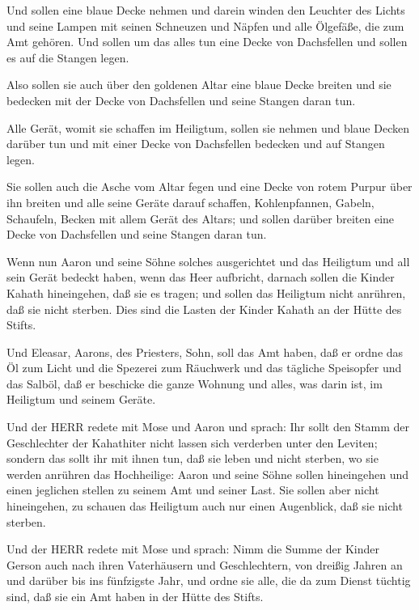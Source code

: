  Und sollen eine blaue Decke nehmen und darein winden den
Leuchter des Lichts und seine Lampen mit seinen Schneuzen und Näpfen und
alle Ölgefäße, die zum Amt gehören.  Und sollen um das
alles tun eine Decke von Dachsfellen und sollen es auf die Stangen
legen.

 Also sollen sie auch über den goldenen Altar eine blaue
Decke breiten und sie bedecken mit der Decke von Dachsfellen und seine
Stangen daran tun.

 Alle Gerät, womit sie schaffen im Heiligtum, sollen sie
nehmen und blaue Decken darüber tun und mit einer Decke von Dachsfellen
bedecken und auf Stangen legen.

 Sie sollen auch die Asche vom Altar fegen und eine Decke
von rotem Purpur über ihn breiten  und alle seine Geräte
darauf schaffen, Kohlenpfannen, Gabeln, Schaufeln, Becken mit allem
Gerät des Altars; und sollen darüber breiten eine Decke von Dachsfellen
und seine Stangen daran tun.

 Wenn nun Aaron und seine Söhne solches ausgerichtet und
das Heiligtum und all sein Gerät bedeckt haben, wenn das Heer aufbricht,
darnach sollen die Kinder Kahath hineingehen, daß sie es tragen; und
sollen das Heiligtum nicht anrühren, daß sie nicht sterben. Dies sind
die Lasten der Kinder Kahath an der Hütte des Stifts.

 Und Eleasar, Aarons, des Priesters, Sohn, soll das Amt
haben, daß er ordne das Öl zum Licht und die Spezerei zum Räuchwerk und
das tägliche Speisopfer und das Salböl, daß er beschicke die ganze
Wohnung und alles, was darin ist, im Heiligtum und seinem Geräte.

 Und der HERR redete mit Mose und Aaron und sprach:
 Ihr sollt den Stamm der Geschlechter der Kahathiter nicht
lassen sich verderben unter den Leviten;  sondern das sollt
ihr mit ihnen tun, daß sie leben und nicht sterben, wo sie werden
anrühren das Hochheilige: Aaron und seine Söhne sollen hineingehen und
einen jeglichen stellen zu seinem Amt und seiner Last.  Sie
sollen aber nicht hineingehen, zu schauen das Heiligtum auch nur einen
Augenblick, daß sie nicht sterben.

 Und der HERR redete mit Mose und sprach: 
Nimm die Summe der Kinder Gerson auch nach ihren Vaterhäusern und
Geschlechtern,  von dreißig Jahren an und darüber bis ins
fünfzigste Jahr, und ordne sie alle, die da zum Dienst tüchtig sind, daß
sie ein Amt haben in der Hütte des Stifts.

